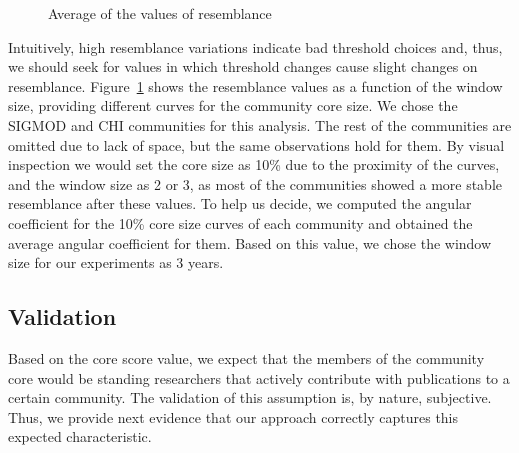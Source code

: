 % 
% 
\begin{figure}[!htb]
  \vspace{-0.3cm}
  \begin{center}
  \end{center}
\vspace{-0.5cm}
\caption{Average of the values of resemblance}
 \label{fig:averange_values_resemblance}
\end{figure}


Intuitively, high resemblance variations indicate bad threshold choices and, thus, we should seek for values in which threshold changes cause slight changes on resemblance.
Figure~\ref{fig:averange_values_resemblance} shows the resemblance values as a function of the window size, providing different curves for the community core size.  We chose the
SIGMOD and CHI communities for this analysis. The rest of the communities are omitted due to lack of space, but the same observations hold for them. By visual inspection we would set the core
size as 10\% due to the proximity of the curves, and the window size as 2 or 3, as most of the communities showed a more stable resemblance after these values. To help us decide, we
computed the angular coefficient for the 10\% core size curves of each community and obtained the average angular coefficient for them.  Based on this value, we chose the window
size for our experiments as 3 years.


\subsection{Validation}

Based on the core score value, we expect that the members of the community core would be standing researchers that actively contribute with publications to a certain community.
The validation of this assumption is, by nature, subjective.  Thus, we provide next evidence that our approach correctly captures this expected characteristic.



